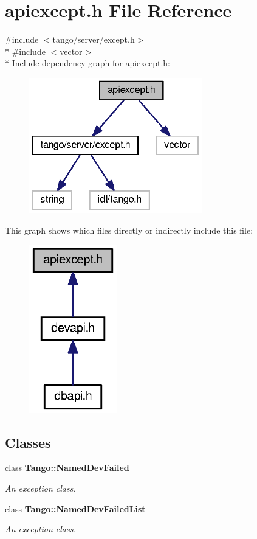 \section{apiexcept.\-h File Reference}
\label{apiexcept_8h}
{\ttfamily \#include $<$tango/server/except.\-h$>$}\\*
{\ttfamily \#include $<$vector$>$}\\*
Include dependency graph for apiexcept.\-h\-:
\nopagebreak
\begin{figure}[H]
\begin{center}
\leavevmode
\includegraphics[width=213pt]{d3/d7f/apiexcept_8h__incl}
\end{center}
\end{figure}
This graph shows which files directly or indirectly include this file\-:
\nopagebreak
\begin{figure}[H]
\begin{center}
\leavevmode
\includegraphics[width=108pt]{dd/d59/apiexcept_8h__dep__incl}
\end{center}
\end{figure}
\subsection*{Classes}
\begin{DoxyCompactItemize}
\item 
class {\bf Tango\-::\-Named\-Dev\-Failed}
\begin{DoxyCompactList}\small\item\em An exception class. \end{DoxyCompactList}\item 
class {\bf Tango\-::\-Named\-Dev\-Failed\-List}
\begin{DoxyCompactList}\small\item\em An exception class. \end{DoxyCompactList}\end{DoxyCompactItemize}
